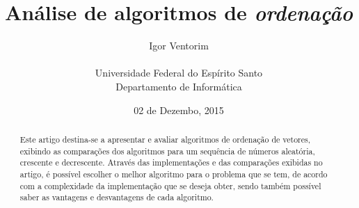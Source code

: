 \documentclass[
	12pt,				%
	oneside,			%
	a4paper,			%
	english,			%
	brazil,				%
	]{article}
\title{\textbf{Análise de algoritmos de \textit{ordenação}}}
\author{Igor Ventorim\\\\Universidade Federal do Espírito Santo\\Departamento de Informática}
\date{02 de Dezembo, 2015}
\begin{document}

\frenchspacing

\maketitle

%	
%



\begin{abstract}
Este artigo destina-se a apresentar e avaliar algoritmos de ordenação de vetores, exibindo as comparações dos algoritmos para um sequência de números aleatória,
crescente e decrescente. Através das implementações e das comparações exibidas no artigo, é possível escolher o melhor algoritmo para o problema que se tem, de 
acordo com a complexidade da implementação que se deseja obter, sendo também possível saber as vantagens e desvantagens de cada algoritmo.
\end{abstract}


\end{document}
